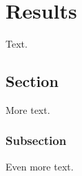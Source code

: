 \chapter{Results}
\label{cha:results}

Text.

\section{Section}

More text.

\subsection{Subsection}

Even more text.